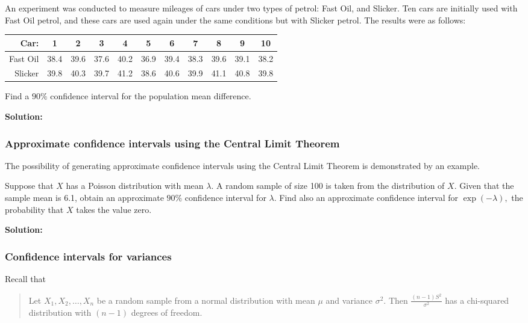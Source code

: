 \documentclass[12pt]{article}
\newenvironment{example}[1][Example:]{\begin{trivlist}
\item[\hskip \labelsep {\bfseries #1}]}{\end{trivlist}}
\begin{document}
\begin{example}
An experiment was conducted to measure mileages of cars under two types of petrol: Fast Oil, and Slicker. Ten cars are initially used with Fast Oil petrol, and these cars are used again under the same conditions but with Slicker petrol. The results were as follows:
\begin{center}
\begin{tabular}{|r|c|c|c|c|c|c|c|c|c|c|}
  \hline
  Car: & 1 & 2 & 3 & 4 & 5 & 6 & 7 & 8 & 9 & 10 \\ \hline
  Fast Oil & 38.4 & 39.6 & 37.6 & 40.2 & 36.9 & 39.4 & 38.3 & 39.6 & 39.1 & 38.2 \\
  Slicker  & 39.8 & 40.3 & 39.7 & 41.2 & 38.6 & 40.6 & 39.9 & 41.1 & 40.8 & 39.8 \\
  \hline
\end{tabular}
\end{center}
Find a $90\%$ confidence interval for the population mean difference.
\end{example}
\begin{mdframed}
{\bf Solution:}
\textcolor[rgb]{1.00,1.00,1.00}{\lipsum[1-4]}
\end{mdframed}

\subsubsection{Approximate confidence intervals using the Central Limit Theorem}
The possibility of generating approximate confidence intervals using the Central Limit Theorem is demonstrated by an example.
\begin{example}
Suppose that $X$ has a Poisson distribution with mean $\lambda$. A random sample of size 100 is taken from the distribution of $X$. Given that the sample mean is 6.1, obtain an approximate $90\%$ confidence interval for $\lambda$. Find also an approximate confidence interval for $\exp(-\lambda),$ the probability that $X$ takes the value zero.
\end{example}
\begin{mdframed}
{\bf Solution:}
\textcolor[rgb]{1.00,1.00,1.00}{\lipsum[1-3]}
\end{mdframed}

\subsubsection{Confidence intervals for variances}
Recall that
\begin{quote}
Let $X_{1},X_{2},\ldots,X_{n}$ be a random sample from a normal distribution with mean $\mu$ and variance $\sigma^2$. Then $\displaystyle \frac{(n-1)S^{2}}{\sigma^{2}}$ has a chi-squared distribution with $(n-1)$ degrees of freedom.
\end{quote}
\end{document}
